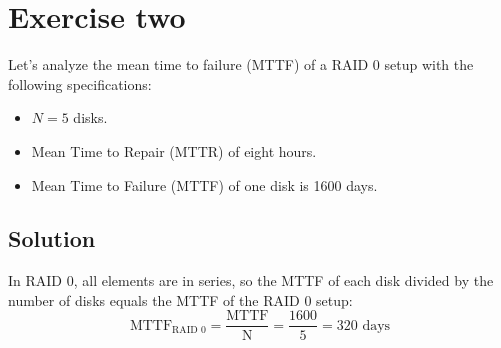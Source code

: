 \section{Exercise two}

Let's analyze the mean time to failure (MTTF) of a RAID 0 setup with the following specifications:
\begin{itemize}
    \item $N=5$ disks.
    \item Mean Time to Repair (MTTR) of eight hours.
    \item Mean Time to Failure (MTTF) of one disk is 1600 days.
\end{itemize}

\subsection*{Solution}
In RAID 0, all elements are in series, so the MTTF of each disk divided by the number of disks equals the MTTF of the RAID 0 setup:
\[\text{MTTF}_{\text{RAID 0}}=\dfrac{\text{MTTF}}{\text{N}}=\dfrac{1600}{5}=320 \text{ days}\]
